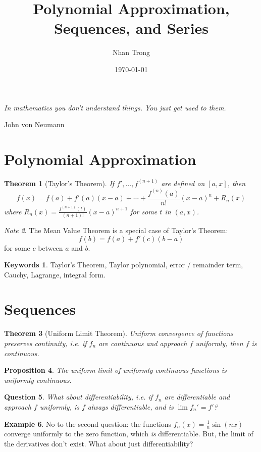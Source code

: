 \documentclass[12pt]{article}
\title{Polynomial Approximation, Sequences, and Series}
\author{Nhan Trong}
\date{\today}                                           %
\theoremstyle{plain}
\newtheorem{theorem}{Theorem}
\newtheorem{proposition}[theorem]{Proposition}
\newtheorem{question}[theorem]{Question}
\theoremstyle{definition}
\newtheorem{example}[theorem]{Example}
\newtheorem{keywords}{Keywords}
\theoremstyle{remark}
\newtheorem{note}[theorem]{Note}
\begin{document}
\sloppy
\maketitle

\epigraph{\textit{In mathematics you don't understand things. You just get used to them.}}{John von Neumann}

\part{Polynomial Approximation}

\begin{theorem}[Taylor's Theorem]
If $f', \ldots, f^{(n+1)}$ are defined on $[a, x]$, then 
$$f(x) = f(a) + f'(a)(x - a) + \cdots + \frac{f^{(n)}(a)}{n!}(x - a)^n + R_n(x)$$
where $R_n(x) = \frac{f^{(n+1)}(t)}{(n+1)!}(x - a)^{n+1}$ for some $t$ in $(a, x)$.
\end{theorem}

\begin{note}
The Mean Value Theorem is a special case of Taylor's Theorem:
$$f(b) = f(a) + f'(c)(b - a)$$
for some $c$ between $a$ and $b$.
\end{note}

\begin{keywords}
Taylor's Theorem, Taylor polynomial, error / remainder term, Cauchy, Lagrange, integral form.
\end{keywords}

\part{Sequences}

\begin{theorem}[Uniform Limit Theorem]
Uniform convergence of functions preserves continuity, i.e. if $f_n$ are continuous and approach $f$ uniformly, then $f$ is continuous.
\end{theorem}

\begin{proposition}
The uniform limit of uniformly continuous functions is uniformly continuous.
\end{proposition}

\begin{question}
What about differentiability, i.e. if $f_n$ are differentiable and approach $f$ uniformly, is $f$ always differentiable, and is $\lim f_n' = f'$? 
\end{question}

\begin{example}
No to the second question: the functions $f_n(x) = \frac{1}{n} \sin(nx)$ converge uniformly to the zero function, which \textit{is} differentiable. But, the limit of the derivatives don't exist. What about just differentiability? 
\end{example}
\end{document}
